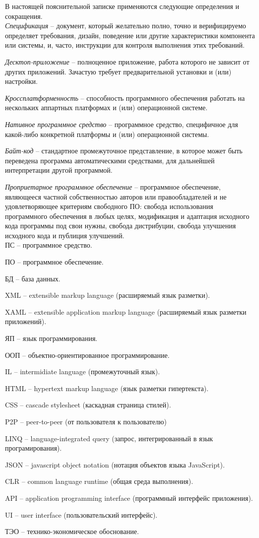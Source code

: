 \label{sec:definitions}

В настоящей пояснительной записке применяются следующие определения и сокращения.
\\

\emph{Спецификация} -- документ, который желательно полно, точно и верифицируемо определяет требования, дизайн, поведение или другие характеристики 
компонента или системы, и, часто, инструкции для контроля выполнения этих требований.

\emph{Десктоп-приложение} -- полноценное приложение, работа которого не зависит от других приложений. 
Зачастую требует предварительной установки и (или) настройки.

\emph{Кроссплатформенность} -- способность программного обеспечения работать на нескольких аппартных платформах и (или) операционной системе.

\emph{Нативное программное средство} -- программное средство, специфичное для какой-либо конкретной платформы и (или) операционной системы.

\emph{Байт-код} -- стандартное промежуточное представление, в которое может быть переведена программа автоматическими средствами, для дальнейшей интерпретации другой программой.

\emph{Проприетарное программное обеспечение} -- программное обеспечение, являющееся частной собственностью авторов или правообладателей и не удовлетворяющее
критериям свободного ПО: свобода использования программного обеспечения в любых целях, модификация и адаптация исходного кода программы под свои нужны, свобода дистрибуции,
свобода улучшения исходного кода и публиция улучшений.
\\

ПС -- программное средство.

ПО -- программное обеспечение.

БД -- база данных.

XML -- extensible markup language (расширяемый язык разметки).

XAML -- extensible application markup language (расширяемый язык разметки приложений).

ЯП -- язык программирования.

ООП -- объектно-ориентированное программирование.

IL -- intermidiate language (промежуточный язык).

HTML -- hypertext markup language (язык разметки гипертекста).

CSS -- cascade stylesheet (каскадная страница стилей).

P2P -- peer-to-peer (от пользователя к пользователю)

LINQ -- language-integrated query (запрос, интегрированный в язык програмирования).

JSON -- javascript object notation (нотация объектов языка JavaScript).

CLR -- common language runtime (общая среда выполнения).

API -- application programming interface (программный интерфейс приложения).

UI -- user interface (пользовательский интерфейс).

ТЭО -- технико-экономическое обоснование.
